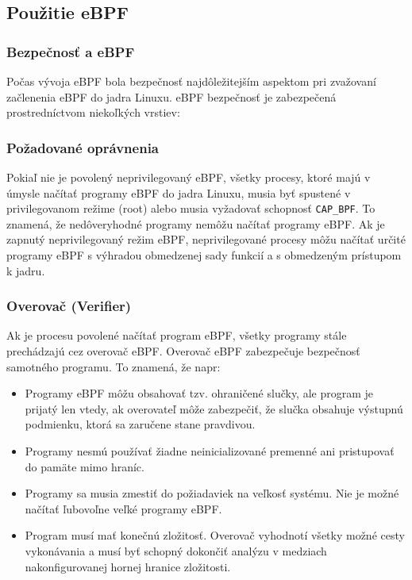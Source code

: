 \subsection{Použitie eBPF}
\subsubsection{Bezpečnosť a eBPF}
Počas vývoja eBPF bola bezpečnosť najdôležitejším aspektom pri zvažovaní začlenenia eBPF do jadra Linuxu. 
eBPF bezpečnosť je zabezpečená prostredníctvom niekoľkých vrstiev:

\subsubsection*{Požadované oprávnenia}
Pokiaľ nie je povolený neprivilegovaný eBPF, všetky procesy, ktoré majú v úmysle načítať programy eBPF do jadra Linuxu, musia byť spustené v privilegovanom režime (root) alebo musia vyžadovať schopnosť \texttt{CAP\_BPF}. To znamená, že nedôveryhodné programy nemôžu načítať programy eBPF.
Ak je zapnutý neprivilegovaný režim eBPF, neprivilegované procesy môžu načítať určité programy eBPF s výhradou obmedzenej sady funkcií a s obmedzeným prístupom k jadru.

\subsubsection*{Overovač (Verifier)}
Ak je procesu povolené načítať program eBPF, všetky programy stále prechádzajú cez overovač eBPF. Overovač eBPF zabezpečuje bezpečnosť samotného programu. To znamená, že napr:
\begin{itemize}
\item Programy eBPF môžu obsahovať tzv. ohraničené slučky, ale program je prijatý len vtedy, ak overovateľ môže zabezpečiť, že slučka obsahuje výstupnú podmienku, ktorá sa zaručene stane pravdivou.
\item Programy nesmú používať žiadne neinicializované premenné ani pristupovať do pamäte mimo hraníc.
\item Programy sa musia zmestiť do požiadaviek na veľkosť systému. Nie je možné načítať ľubovoľne veľké programy eBPF.
\item Program musí mať konečnú zložitosť. Overovač vyhodnotí všetky možné cesty vykonávania a musí byť schopný dokončiť analýzu v medziach nakonfigurovanej hornej hranice zložitosti.
\end{itemize}

